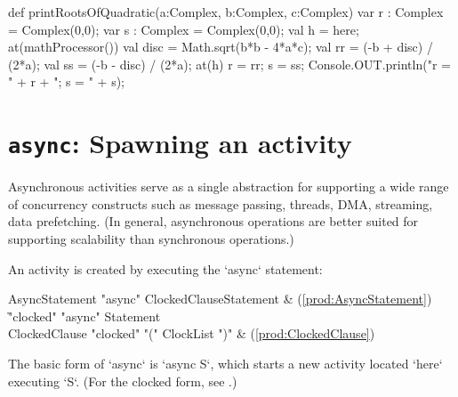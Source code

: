 \begin{xten}
def printRootsOfQuadratic(a:Complex, b:Complex, c:Complex) {
  var r : Complex = Complex(0,0);
  var s : Complex = Complex(0,0);
  val h = here;
  at(mathProcessor()) {
    val disc = Math.sqrt(b*b - 4*a*c);
    val rr = (-b + disc) / (2*a);
    val ss = (-b - disc) / (2*a);
    at(h) {
      r = rr; s = ss;
    }
  }
  Console.OUT.println("r = " + r + "; s = " + s);
}
\end{xten}
\section{{\tt async}: Spawning an activity}\label{AsynchronousActivity}\label{AsyncActivity}

Asynchronous activities serve as a single abstraction for supporting a
wide range of concurrency constructs such as message passing, threads,
DMA, streaming, data prefetching. (In general, asynchronous operations
are better suited for supporting scalability than synchronous
operations.)

An activity is created by executing the \xcd`async` statement: 

\begin{bbgrammar}
 AsyncStatement    \: \xcd"async" ClockedClause\opt Statement & (\ref{prod:AsyncStatement})\\%
    \| \xcd"clocked" \xcd"async" Statement\\

 ClockedClause    \: \xcd"clocked" \xcd"(" ClockList \xcd")" & (\ref{prod:ClockedClause})\\%
\end{bbgrammar}



The basic form of \xcd`async` is \xcd`async S`, which starts a new activity
located \xcd`here` executing \xcd`S`.   (For the clocked form, see
.)  


